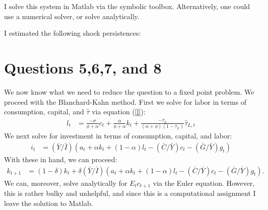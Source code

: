 \documentclass[11pt]{article} %
\begin{document}
I solve this system in Matlab via the symbolic toolbox. Alternatively, one could use a numerical solver, or solve analytically.


I estimated the following shock persistences:

\begin{center}

\end{center}

\section{Questions 5,6,7, and 8}
We now know what we need to reduce the question to a fixed point problem. We proceed with the Blanchard-Kahn method. First we solve for labor in terms of consumption, capital, and $\hat{\tau}$ via equation (\ref{l}):
\begin{align*}
l_t &= \frac{-\sigma}{\phi + \alpha}c_t + \frac{\alpha}{\phi + \alpha}k_t +  \frac{-\bar{\tau}_{L}}{(\alpha + \phi)(1-\bar{\tau}_{L})}\hat{\tau}_{L,t}
\end{align*}
We next solve for investment in terms of consumption, capital, and labor:
\begin{align*}
i_t &= (\bar{Y}/\bar{I})(a_t + \alpha k_t + (1-\alpha)l_t  -   (\bar{C}/\bar{Y})c_t -  (\bar{G}/\bar{Y})g_t)
\end{align*}
With these in hand, we can proceed:
\begin{align*}
k_{t+1} &= (1-\delta)k_t + \delta  (\bar{Y}/\bar{I})(a_t + \alpha k_t + (1-\alpha)l_t  -   (\bar{C}/\bar{Y})c_t -  (\bar{G}/\bar{Y})g_t).
\end{align*}
We can, moreover, solve analytically for $E_tc_{t+1}$ via the Euler equation. However, this is rather bulky and unhelpful, and since this is a computational assignment I leave the solution to Matlab.
\end{document}

